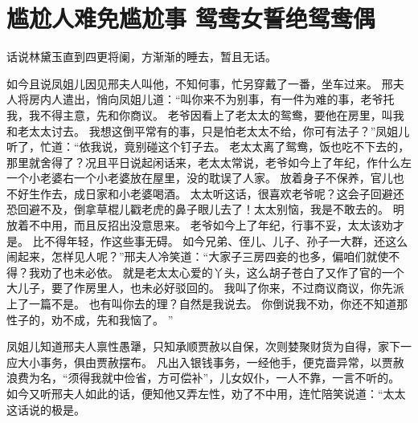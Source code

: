 \chapter{尴尬人难免尴尬事 \quad 鸳鸯女誓绝鸳鸯偶}
\par
{}\par
话说林黛玉直到四更将阑，方渐渐的睡去，暂且无话。
\par
如今且说凤姐儿因见邢夫人叫他，不知何事，忙另穿戴了一番，坐车过来。
邢夫人将房内人遣出，悄向凤姐儿道：“叫你来不为别事，有一件为难的事，老爷托我，我不得主意，先和你商议。
老爷因看上了老太太的鸳鸯，要他在房里，叫我和老太太讨去。
我想这倒平常有的事，只是怕老太太不给，你可有法子？”凤姐儿听了，忙道：“依我说，竟别碰这个钉子去。
老太太离了鸳鸯，饭也吃不下去的，那里就舍得了？况且平日说起闲话来，老太太常说，老爷如今上了年纪，作什么左一个小老婆右一个小老婆放在屋里，没的耽误了人家。
放着身子不保养，官儿也不好生作去，成日家和小老婆喝酒。
太太听这话，很喜欢老爷呢？这会子回避还恐回避不及，倒拿草棍儿戳老虎的鼻子眼儿去了！太太别恼，我是不敢去的。
明放着不中用，而且反招出没意思来。
老爷如今上了年纪，行事不妥，太太该劝才是。
比不得年轻，作这些事无碍。
如今兄弟、侄儿、儿子、孙子一大群，还这么闹起来，怎样见人呢？”邢夫人冷笑道：“大家子三房四妾的也多，偏咱们就使不得？我劝了也未必依。
就是老太太心爱的丫头，这么胡子苍白了又作了官的一个大儿子，要了作房里人，也未必好驳回的。
我叫了你来，不过商议商议，你先派上了一篇不是。
也有叫你去的理？自然是我说去。
你倒说我不劝，你还不知道那性子的，劝不成，先和我恼了。
”\par
凤姐儿知道邢夫人禀性愚犟，只知承顺贾赦以自保，次则婪聚财货为自得，家下一应大小事务，俱由贾赦摆布。
凡出入银钱事务，一经他手，便克啬异常，以贾赦浪费为名，“须得我就中俭省，方可偿补”，儿女奴仆，一人不靠，一言不听的。
如今又听邢夫人如此的话，便知他又弄左性，劝了不中用，连忙陪笑说道：“太太这话说的极是。
